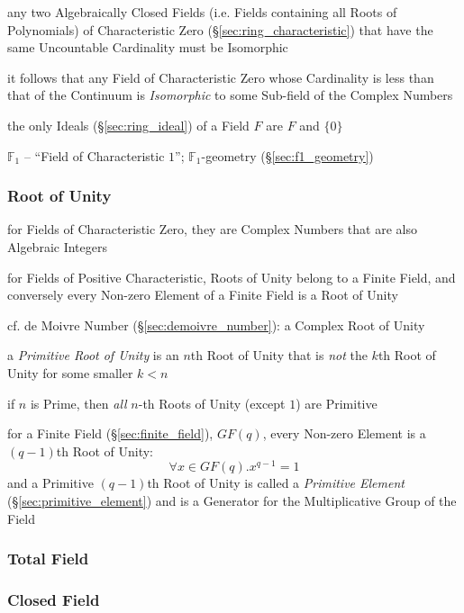 any two Algebraically Closed Fields (i.e. Fields containing all Roots of
Polynomials) of Characteristic Zero (\S\ref{sec:ring_characteristic}) that have
the same Uncountable Cardinality must be Isomorphic

it follows that any Field of Characteristic Zero whose Cardinality is less than
that of the Continuum is \emph{Isomorphic} to some Sub-field of the Complex
Numbers

the only Ideals (\S\ref{sec:ring_ideal}) of a Field $F$ are $F$ and $\{0\}$

\fist $\mathbb{F}_1$ -- ``Field of Characteristic $1$''; $\mathbb{F}_1$-geometry
(\S\ref{sec:f1_geometry})



\subsubsection{Root of Unity}\label{sec:root_of_unity}

for Fields of Characteristic Zero, they are Complex Numbers that are also
Algebraic Integers

for Fields of Positive Characteristic, Roots of Unity belong to a Finite Field,
and conversely every Non-zero Element of a Finite Field is a Root of Unity

cf. de Moivre Number (\S\ref{sec:demoivre_number}): a Complex Root of Unity

a \emph{Primitive Root of Unity} is an $n$th Root of Unity that is \emph{not}
the $k$th Root of Unity for some smaller $k < n$

if $n$ is Prime, then \emph{all} $n$-th Roots of Unity (except $1$) are
Primitive

for a Finite Field (\S\ref{sec:finite_field}), $GF(q)$, every Non-zero Element
is a $(q-1)$th Root of Unity:
\[
  \forall x \in GF(q). x^{q-1} = 1
\]
and a Primitive $(q-1)$th Root of Unity is called a \emph{Primitive Element}
(\S\ref{sec:primitive_element}) and is a Generator for the Multiplicative Group
of the Field



\subsubsection{Total Field}\label{sec:total_field}

\subsubsection{Closed Field}\label{sec:closed_field}


